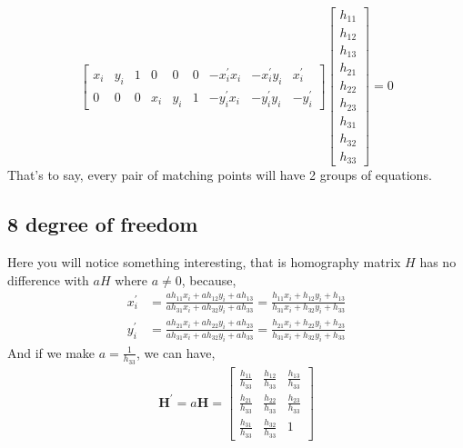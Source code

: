 \documentclass[12pt, a4 paper]{article}
\begin{document}
\begin{equation}
    \begin{bmatrix}
        x_{i} & y_{i} & 1 & 0 & 0 & 0 & -x_{i}^{\prime}x_{i} 
        & -x_{i}^{\prime}y_{i} & x_{i}^{\prime}\\
        0 & 0 & 0 & x_{i} & y_{i} & 1 & -y_{i}^{\prime}x_{i} &
        -y_{i}^{\prime}y_{i} & -y_{i}^{\prime}
    \end{bmatrix}
    \begin{bmatrix}
        h_{11} \\ h_{12} \\h_{13}\\h_{21}\\h_{22}\\h_{23}\\
        h_{31}\\h_{32}\\h_{33}
    \end{bmatrix} = 0
\end{equation}
\indent That's to say, every pair of matching points will have
2 groups of equations.

\subsection{8 degree of freedom}
Here you will notice something interesting, that is homography
matrix $H$ has no difference with $aH$ where $a\neq 0$, because,
\begin{align}
    x_{i}^{\prime} &= \frac{ah_{11}x_{i} + ah_{12}y_{i} + ah_{13}}
    {ah_{31}x_{i} + ah_{32}y_{i} + ah_{33}} = 
    \frac{h_{11}x_{i} + h_{12}y_{i} + h_{13}}
    {h_{31}x_{i} + h_{32}y_{i} + h_{33}}\\
    y_{i}^{\prime} &= \frac{ah_{21}x_{i} + ah_{22}y_{i} + ah_{23}}
    {ah_{31}x_{i} + ah_{32}y_{i} + ah_{33}} =
    \frac{h_{21}x_{i} + h_{22}y_{i} + h_{23}}
    {h_{31}x_{i} + h_{32}y_{i} + h_{33}}
\end{align}
\indent And if we make $a=\frac{1}{h_{33}}$, we can have,
\setlength{\arraycolsep}{3.0pt}
\renewcommand{\arraystretch}{1.5}
\begin{equation}
    \begin{array}{lc}
        \boldsymbol{H}^{\prime} = a\boldsymbol{H} = 
        \begin{bmatrix}
            \frac{h_{11}}{h_{33}} & \frac{h_{12}}{h_{33}} & \frac{h_{13}}{h_{33}}\\
            \frac{h_{21}}{h_{33}} & \frac{h_{22}}{h_{33}} & \frac{h_{23}}{h_{33}}\\
            \frac{h_{31}}{h_{33}} & \frac{h_{32}}{h_{33}} & 1
        \end{bmatrix}
    \end{array}
\end{equation}
\end{document}
